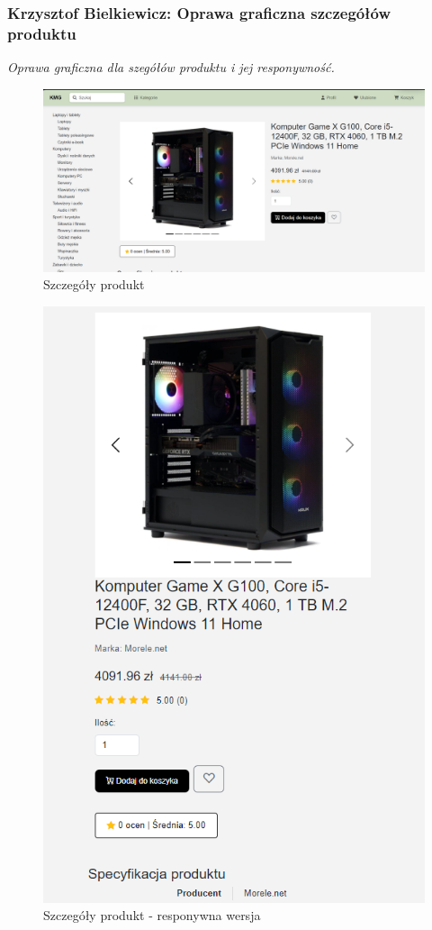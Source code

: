\documentclass[12pt,a4paper,oneside]{article}
\theoremstyle{definition}
\numberwithin{equation}{section}
\begin{document}
\subsubsection{Krzysztof Bielkiewicz: Oprawa graficzna szczegółów produktu}
\label{1.3.16}
\textit{Oprawa graficzna dla szegółów produktu i jej responywność.}
\begin{figure}[H]
    \centering
    \includegraphics[width=1.0\columnwidth]{images/krzysztofBImages/product-detail.png}
    \caption{Szczegóły produkt}
\end{figure}
\begin{figure}[H]
    \centering
    \includegraphics[width=0.5\columnwidth]{images/krzysztofBImages/product-detail-respo.png}
    \caption{Szczegóły produkt - responywna wersja}
\end{figure}




\end{document}

